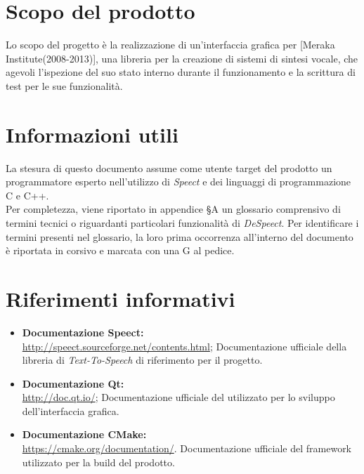 \documentclass[openany,12pt,a4paper]{report}
\begin{document}
	\section{Scopo del prodotto}
	
	Lo scopo del progetto è la realizzazione di un’interfaccia grafica per  [Meraka Institute(2008-2013)], una libreria per la creazione di sistemi di sintesi vocale, che agevoli l’ispezione del suo stato interno durante il funzionamento e la scrittura di test per le sue funzionalità.
	
	\section{Informazioni utili}
	
	La stesura di questo documento assume come utente target del prodotto un programmatore esperto nell'utilizzo di \textit{Speect} e dei linguaggi di programmazione C e C++. \\
	\noindent Per completezza, viene riportato in appendice §A un glossario comprensivo di termini tecnici o riguardanti particolari funzionalità di \textit{DeSpeect}. Per identificare i termini presenti nel glossario, la loro prima occorrenza all’interno del documento è riportata in corsivo e marcata con una G al pedice. 
	

	
	\section{Riferimenti informativi}

	\begin{itemize}
		\item \textbf{Documentazione Speect:} \\
		\url{http://speect.sourceforge.net/contents.html};
		\subitem Documentazione ufficiale della libreria di \textit{Text-To-Speech} di riferimento per il progetto.
		
		\item \textbf{Documentazione Qt:} \\
		\url{http://doc.qt.io/};
		\subitem Documentazione ufficiale del  utilizzato per lo sviluppo dell'interfaccia grafica.
		
		\item \textbf{Documentazione CMake:} \\
		\url{https://cmake.org/documentation/}.
		\subitem Documentazione ufficiale del framework utilizzato per la build del prodotto. 
	\end{itemize}
\end{document}
